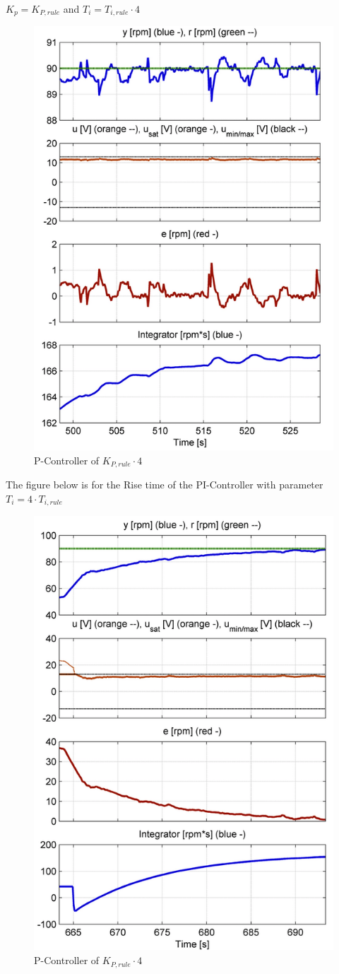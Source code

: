 \begin{center}
{$K_{p}= K_{P,rule}$ and $T_{i}=T_{i,rule}\cdot4$}
\end{center}
\begin{figure}[H]
\begin{center}
\includegraphics[width=0.6\linewidth]{images/general//PI/PI_Controller4}
\end{center}
\caption{P-Controller of $ K_{P,rule}\cdot4$}
\label{fig:PI_Controller4}
\end{figure}

The figure below is for the Rise time of the PI-Controller with parameter $T_{i}=4\cdot{T_{i,rule}}$
\begin{figure}[H]
\begin{center}
\includegraphics[width=0.6\linewidth]{images/general//PI/PI_RiseTime4}
\end{center}
\caption{P-Controller of $ K_{P,rule}\cdot4$}
\label{fig:PI_RiseTime4}
\end{figure}
\clearpage
